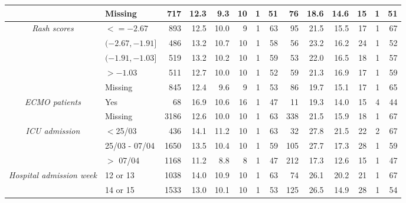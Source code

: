 \documentclass[review]{elsarticle}
\begin{document}
\begin{landscape}
\begin{table}[htb]
\begin{tabular}{cc|rrrrrr|rrrrrr}
          & \multicolumn{1}{l|}{Missing} & 717   & 12.3  & 9.3   & 10    & 1     & 51    & 76    & 18.6  & 14.6  & 15    & 1     & 51 \\
    \midrule
    \multicolumn{1}{c}{\multirow{5}[t]{0.11\textwidth}{\textit{Rash scores}}} & \multicolumn{1}{l|}{$<= -2.67$} & 893   & 12.5  & 10.0  & 9     & 1     & 63    & 95    & 21.5  & 15.5  & 17    & 1     & 67 \\
          & \multicolumn{1}{l|}{$(-2.67, -1.91]$} & 486   & 13.2  & 10.7  & 10    & 1     & 58    & 56    & 23.2  & 16.2  & 24    & 1     & 52 \\
          & \multicolumn{1}{l|}{$(-1.91, -1.03]$} & 519   & 13.2  & 10.2  & 10    & 1     & 59    & 53    & 22.0  & 16.5  & 18    & 1     & 57 \\
          & \multicolumn{1}{l|}{$> -1.03$} & 511   & 12.7  & 10.0  & 10    & 1     & 52    & 59    & 21.3  & 16.9  & 17    & 1     & 59 \\
          & \multicolumn{1}{l|}{Missing} & 845   & 12.4  & 9.6   & 9     & 1     & 53    & 86    & 19.7  & 15.1  & 17    & 1     & 65 \\
    \midrule
    \multicolumn{1}{c}{\multirow{2}[1]{0.11\textwidth}{\textit{ECMO patients}}} & \multicolumn{1}{l|}{Yes} & 68    & 16.9  & 10.6  & 16    & 1     & 47    & 11    & 19.3  & 14.0  & 15    & 4     & 44 \\
          & \multicolumn{1}{l|}{Missing} & 3186  & 12.6  & 10.0  & 10    & 1     & 63    & 338   & 21.5  & 15.9  & 18    & 1     & 67 \\
    \midrule
    \multicolumn{1}{c}{\multirow{3}[t]{0.11\textwidth}{\textit{ICU admission}}} & \multicolumn{1}{l|}{$<$25/03} & 436   & 14.1  & 11.2  & 10    & 1     & 63    & 32    & 27.8  & 21.5  & 22    & 2     & 67 \\
          & \multicolumn{1}{l|}{25/03 - 07/04} & 1650  & 13.5  & 10.4  & 10    & 1     & 59    & 105   & 27.7  & 17.3  & 28    & 1     & 59 \\
          & \multicolumn{1}{l|}{$>$ 07/04} & 1168  & 11.2  & 8.8   & 8     & 1     & 47    & 212   & 17.3  & 12.6  & 15    & 1     & 47 \\
    \midrule
    \multicolumn{1}{c}{\multirow{5}[t]{0.11\textwidth}{\textit{Hospital admission week}}} & \multicolumn{1}{l|}{12 or 13} & 1038  & 14.0  & 10.9  & 10    & 1     & 63    & 74    & 26.1  & 20.2  & 21    & 1     & 67 \\
          & \multicolumn{1}{l|}{14 or 15} & 1533  & 13.0  & 10.1  & 10    & 1     & 53    & 125   & 26.5  & 14.9  & 28    & 1     & 54 \\

\end{tabular}
\end{table}
\end{landscape}
\end{document}
